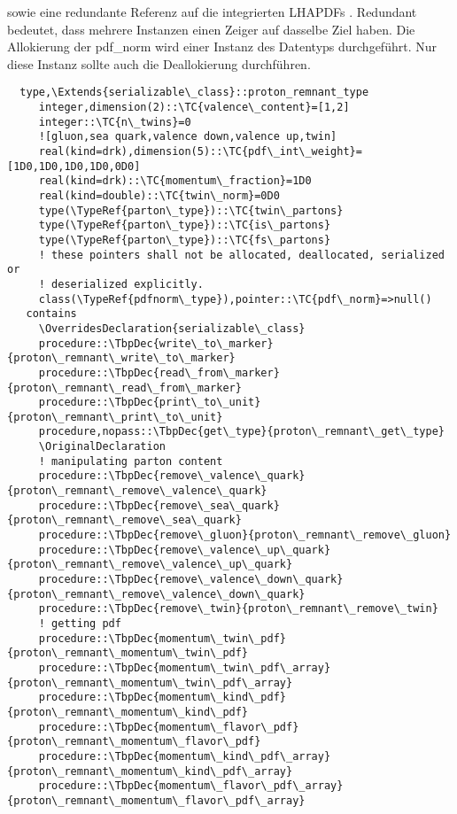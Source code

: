 sowie eine redundante Referenz auf die integrierten LHAPDFs .
Redundant bedeutet, dass mehrere Instanzen einen Zeiger auf dasselbe Ziel haben. Die Allokierung der pdf\_norm wird einer Instanz des Datentyps  durchgeführt. Nur diese Instanz sollte auch die Deallokierung durchführen.
\begin{Verbatim}
  type,\Extends{serializable\_class}::proton_remnant_type
     integer,dimension(2)::\TC{valence\_content}=[1,2]
     integer::\TC{n\_twins}=0
     ![gluon,sea quark,valence down,valence up,twin]
     real(kind=drk),dimension(5)::\TC{pdf\_int\_weight}=[1D0,1D0,1D0,1D0,0D0]
     real(kind=drk)::\TC{momentum\_fraction}=1D0
     real(kind=double)::\TC{twin\_norm}=0D0
     type(\TypeRef{parton\_type})::\TC{twin\_partons}
     type(\TypeRef{parton\_type})::\TC{is\_partons}
     type(\TypeRef{parton\_type})::\TC{fs\_partons}
     ! these pointers shall not be allocated, deallocated, serialized or
     ! deserialized explicitly.
     class(\TypeRef{pdfnorm\_type}),pointer::\TC{pdf\_norm}=>null()
   contains
     \OverridesDeclaration{serializable\_class}
     procedure::\TbpDec{write\_to\_marker}{proton\_remnant\_write\_to\_marker}
     procedure::\TbpDec{read\_from\_marker}{proton\_remnant\_read\_from\_marker}
     procedure::\TbpDec{print\_to\_unit}{proton\_remnant\_print\_to\_unit}
     procedure,nopass::\TbpDec{get\_type}{proton\_remnant\_get\_type}
     \OriginalDeclaration
     ! manipulating parton content
     procedure::\TbpDec{remove\_valence\_quark}{proton\_remnant\_remove\_valence\_quark}
     procedure::\TbpDec{remove\_sea\_quark}{proton\_remnant\_remove\_sea\_quark}
     procedure::\TbpDec{remove\_gluon}{proton\_remnant\_remove\_gluon}
     procedure::\TbpDec{remove\_valence\_up\_quark}{proton\_remnant\_remove\_valence\_up\_quark}
     procedure::\TbpDec{remove\_valence\_down\_quark}{proton\_remnant\_remove\_valence\_down\_quark}
     procedure::\TbpDec{remove\_twin}{proton\_remnant\_remove\_twin}
     ! getting pdf
     procedure::\TbpDec{momentum\_twin\_pdf}{proton\_remnant\_momentum\_twin\_pdf}
     procedure::\TbpDec{momentum\_twin\_pdf\_array}{proton\_remnant\_momentum\_twin\_pdf\_array}
     procedure::\TbpDec{momentum\_kind\_pdf}{proton\_remnant\_momentum\_kind\_pdf}
     procedure::\TbpDec{momentum\_flavor\_pdf}{proton\_remnant\_momentum\_flavor\_pdf}
     procedure::\TbpDec{momentum\_kind\_pdf\_array}{proton\_remnant\_momentum\_kind\_pdf\_array}
     procedure::\TbpDec{momentum\_flavor\_pdf\_array}{proton\_remnant\_momentum\_flavor\_pdf\_array}

\end{Verbatim}

